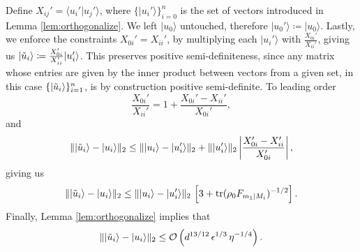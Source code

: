 Define $X_{ij}'=\langle u_i' \vert u_j'\rangle$, where $\{\vert u_i' \rangle\}_{i=0}^{n}$ is the set of vectors introduced in Lemma \ref{lem:orthogonalize}. We left $\vert u_0 \rangle$ untouched, therefore $\vert u_0' \rangle \coloneqq \vert u_0 \rangle$. 
Lastly, we enforce the constraints $X_{0i}'=X_{ii}'$, by multiplying each $\vert u_i' \rangle$ with $\frac{X_{0i}'}{X_{ii}'}$, giving us $\vert \Tilde{u}_i \rangle \coloneqq \frac{X_{0i}'}{X_{ii}'} \vert u_i' \rangle$. This preserves positive semi-definiteness, since any matrix whose entries are given by the inner product between vectors from a given set, in this case $\{\vert \Tilde{u}_i \rangle\}_{i=1}^n$, is by construction positive semi-definite. To leading order \[\frac{X_{0i}'}{X_{ii}'}=1+\frac{X_{0i}'-X_{ii}'}{X_{0i}'},\]
and \[\|\vert \Tilde{u}_i \rangle - \vert u_i \rangle\|_2 \leq \|\vert u_i \rangle -\vert u_i' \rangle\|_2+\|\vert u_i'\rangle\|_2 \left| \frac{X_{0i}'-X_{ii}'}{X_{0i}'} \right|,\]
giving us \[\|\vert \Tilde{u}_i \rangle - \vert u_i \rangle\|_2\leq \|\vert u_i \rangle -\vert u_i' \rangle\|_2\,\left[3+\operatorname{tr}(\rho_0 F_{m_1\vert M_i})^{-1/2}\right].\]
Finally, Lemma \ref{lem:orthogonalize} implies that \[\|\vert \Tilde{u}_i \rangle - \vert u_i \rangle\|_2 \leq \mathcal{O}\left(d^{13/12}\,\epsilon^{1/3}\,\eta^{-1/4}\right). \]